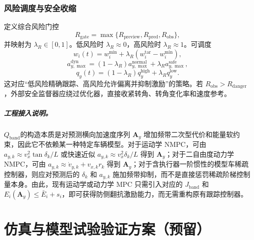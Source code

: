 \documentclass[UTF8,zihao=-4]{ctexrep}
\newcommand{\Qband}{$Q_{\mathrm{band}}$}
\begin{document}
\subsection{风险调度与安全收缩}
定义综合风险门控
\begin{equation}
    R_{\mathrm{gate}}=\max\{R_{\mathrm{preview}},R_{\mathrm{pred}},R_{\mathrm{obs}}\},
\end{equation}
并映射为 $\lambda_R\in[0,1]$。低风险时 $\lambda_R\approx0$，高风险时 $\lambda_R\approx1$。可调度
\begin{equation}
    w_i(t)=w_i^{\min}+\lambda_R(w_i^{\mathrm{tar}}-w_i^{\min}),
\end{equation}
\begin{equation}
    a_{y,\max}^{\mathrm{dyn}}=(1-\lambda_R)a_{y,\max}^{\mathrm{normal}}+\lambda_Ra_{y,\max}^{\mathrm{safe}},
\end{equation}
\begin{equation}
    q_y(t)=(1-\lambda_R)q_y^{\mathrm{high}}+\lambda_Rq_y^{\mathrm{low}}.
\end{equation}
这对应“低风险精确跟踪、高风险允许偏离并抑制激励”的策略。若 $R_{\mathrm{obs}}>R_{\mathrm{danger}}$，外部安全监督器应绕过优化器，直接收紧转角、转角变化率和速度参考。


\paragraph{工程接入说明。}
\Qband 的构造本质是对预测横向加速度序列 $\bm A_y$ 增加频带二次型代价和能量软约束，因此它不依赖某一种特定车辆模型。对于运动学 NMPC，可由 $a_{y,k}\approx v_x^2\tan\delta_k/L$ 或快速近似 $a_{y,k}\approx v_x^2\delta_k/L$ 得到 $\bm A_y$；对于二自由度动力学 NMPC，可由 $a_{y,k}\approx \dot v_{y,k}+v_{x,k}r_k$ 得到 $\bm A_y$；对于含执行器一阶惯性的模型车稀疏控制器，则应对预测后的 $\delta_k$ 和 $a_{y,k}$ 施加频带抑制，而不是直接惩罚稀疏阶梯控制量本身。由此，现有运动学或动力学 MPC 只需引入对应的 $J_{\mathrm{band}}$ 和 $E_i(\bm A_y)\leq \bar E_i+s_i$，即可获得防侧翻抗激励能力，而无需重构原有跟踪控制器。

\chapter{仿真与模型试验验证方案（预留）}
\end{document}
